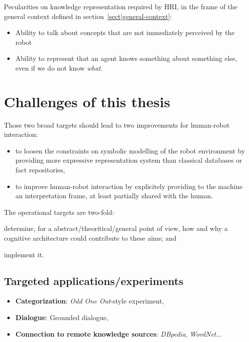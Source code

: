 Pecularities on knowledge representation required by HRI, in the frame of the
general context defined in section~\ref{sect|general-context}:

\begin{itemize}

	\item Ability to talk about concepts that are not immediately perceived by
	the robot

	\item {} Ability to represent that an agent knows something about
	something else, even if we do not know \emph{what}.

\end{itemize}

\section{Challenges of this thesis}
\label{sect|krs-challenges}

Those two broad targets should lead to two improvements for human-robot
interaction:


\begin{itemize}
	\item to loosen the constraints on symbolic modelling of the robot
	environment by providing more expressive representation system than
	classical databases or fact repositories,

	\item to improve human-robot interaction by explicitely providing to the
	machine an interpretation frame, at least partially shared with the human.

\end{itemize}

The operational targets are two-fold:

\begin{inparaenum}

	\item determine, for a abstract/theoritical/general point of view, how and
	why a cognitive architecture could contribute to these aims; and

	\item implement it.

\end{inparaenum}

\subsection{Targeted applications/experiments}

\begin{itemize}
	\item \textbf{Categorization}: \emph{Odd One Out}-style experiment,
	\item \textbf{Dialogue}: Grounded dialogue,
	\item \textbf{Connection to remote knowledge sources}: \emph{DBpedia}, \emph{WordNet}...
\end{itemize}
